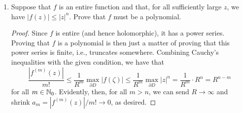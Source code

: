 \documentclass[../psets.tex]{subfiles}
\begin{document}
\begin{enumerate}[label={\textbf{\arabic*.}}]
\begin{proof}
        \begin{equation*}
            \lim_{k\to\infty}\left| \frac{z^{2^{k+1}}}{z^{2^k}} \right| = \lim_{k\to\infty}\frac{|z|^{2\cdot 2^k}}{|z|^{2^k}}
            = \lim_{k\to\infty}|z|^{2^k}
            = \infty
            > 1
        \end{equation*} 
        so the series diverges at $z$, contradicting the existence of $g$.
    \end{proof}
    \item Suppose that $f$ is an entire function and that, for all sufficiently large $z$, we have $|f(z)|\leq|z|^n$. Prove that $f$ must be a polynomial.
    \begin{proof}
        Since $f$ is entire (and hence holomorphic), it has a power series. Proving that $f$ is a polynomial is then just a matter of proving that this power series is finite, i.e., truncates somewhere. Combining Cauchy's inequalities with the given condition, we have that
        \begin{equation*}
            \frac{|f^{(m)}(z)|}{m!} \leq \frac{1}{R^m}\max_{\partial D}|f(\zeta)|
            \leq \frac{1}{R^m}\max_{\partial D}|z|^n
            = \frac{1}{R^m}\cdot R^n
            = R^{n-m}
        \end{equation*}
        for all $m\in\mathbb{N}_0$. Evidently, then, for all $m>n$, we can send $R\to\infty$ and shrink $a_m=|f^{(m)}(z)|/m!\to 0$, as desired.
    \end{proof}
\end{enumerate}
\end{document}
